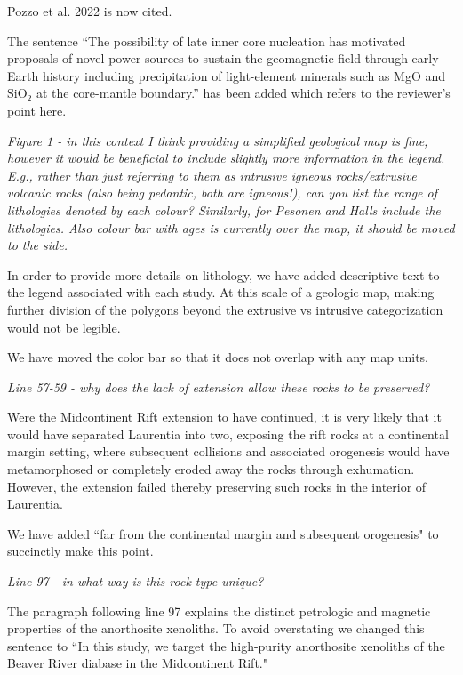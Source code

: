 \documentclass[11pt, letterpaper]{article}
\begin{document}
\begin{flushleft}
Pozzo et al. 2022 is now cited.

The sentence ``The possibility of late inner core nucleation has motivated proposals of novel power sources to sustain the geomagnetic field through early Earth history including precipitation of light-element minerals such as MgO \citep{Badro2016a, ORourke2016a, ORourke2016b} and SiO$_2$ \citep{Mittal2020a} at the core-mantle boundary.'' has been added which refers to the reviewer's point here.

\textit{Figure 1 - in this context I think providing a simplified geological map is fine, however it would be beneficial to include slightly more information in the legend. E.g., rather than just referring to them as intrusive igneous rocks/extrusive volcanic rocks (also being pedantic, both are igneous!), can you list the range of lithologies denoted by each colour? Similarly, for Pesonen and Halls include the lithologies. Also colour bar with ages is currently over the map, it should be moved to the side.}

In order to provide more details on lithology, we have added descriptive text to the legend associated with each study. At this scale of a geologic map, making further division of the polygons beyond the extrusive vs intrusive categorization would not be legible.

We have moved the color bar so that it does not overlap with any map units.

\textit{Line 57-59 - why does the lack of extension allow these rocks to be preserved?}

Were the Midcontinent Rift extension to have continued, it is very likely that it would have separated Laurentia into two, exposing the rift rocks at a continental margin setting, where subsequent collisions and associated orogenesis would have metamorphosed or completely eroded away the rocks through exhumation. However, the extension failed thereby preserving such rocks in the interior of Laurentia.

We have added ``far from the continental margin and subsequent orogenesis" to succinctly make this point.

\textit{Line 97 - in what way is this rock type unique?}

The paragraph following line 97 explains the distinct petrologic and magnetic properties of the anorthosite xenoliths. To avoid overstating we changed this sentence to ``In this study, we target the high-purity anorthosite xenoliths of the Beaver River diabase in the Midcontinent Rift." 


\end{flushleft}
\end{document}
